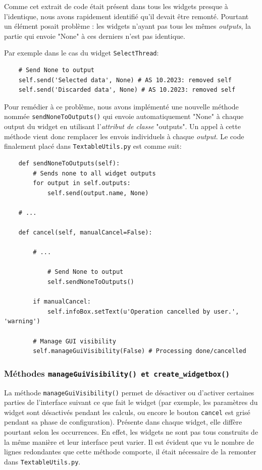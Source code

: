 \documentclass{article}
\begin{document}
Comme cet extrait de code était présent dans tous les widgets presque à l'identique, nous avons rapidement identifié qu'il devait être remonté. Pourtant un élément posait problème : les widgets n'ayant pas tous les mêmes \textit{outputs}, la partie qui envoie "None" à ces derniers n'est pas identique.

Par exemple dans le cas du widget \texttt{SelectThread}:

\begin{verbatim}
    # Send None to output 
    self.send('Selected data', None) # AS 10.2023: removed self
    self.send('Discarded data', None) # AS 10.2023: removed self
\end{verbatim}

Pour remédier à ce problème, nous avons implémenté une nouvelle méthode nommée \texttt{sendNoneToOutputs()} qui envoie automatiquement "None" à chaque output du widget en utilisant l'\textit{attribut de classe} "outputs". Un appel à cette méthode vient donc remplacer les envois individuels à chaque \textit{output}. Le code finalement placé dans \texttt{TextableUtils.py} est comme suit:

\begin{verbatim}
    def sendNoneToOutputs(self):
        # Sends none to all widget outputs
        for output in self.outputs:
            self.send(output.name, None)

    # ...

    def cancel(self, manualCancel=False):

        # ...
            
            # Send None to output
            self.sendNoneToOutputs()
            
        if manualCancel:
            self.infoBox.setText(u'Operation cancelled by user.', 'warning')
            
        # Manage GUI visibility
        self.manageGuiVisibility(False) # Processing done/cancelled
\end{verbatim}

\subsubsection{Méthodes \texttt{manageGuiVisibility() et \texttt{create\_widgetbox()}}}

La méthode \texttt{manageGuiVisibility()} permet de désactiver ou d'activer certaines parties de l'interface suivant ce que fait le widget (par exemple, les paramètres du widget sont désactivés pendant les calculs, ou encore le bouton \texttt{cancel} est grisé pendant sa phase de configuration). 
Présente dans chaque widget, elle diffère pourtant selon les occurrences. En effet, les widgets ne sont pas tous construits de la même manière et leur interface peut varier. Il est évident que vu le nombre de lignes redondantes que cette méthode comporte, il était nécessaire de la remonter dans \texttt{TextableUtils.py}.
\newline
\end{document}

